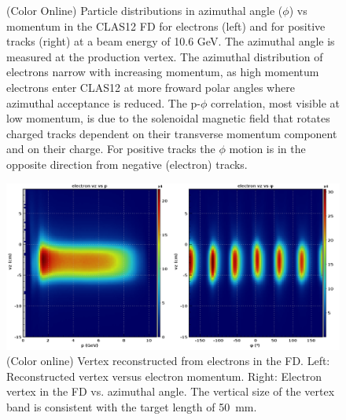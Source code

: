 \documentclass[final,3p,twocolumn]{elsarticle}
\begin{document}
\begin{figure}[h!]
\caption{(Color Online) Particle distributions in azimuthal angle ($\phi$) vs momentum in the CLAS12 FD for electrons (left) and for positive
 tracks (right) at a beam energy of 10.6 GeV.  The azimuthal angle is measured at the production vertex. The azimuthal distribution of electrons 
 narrow with increasing momentum, as high momentum electrons enter CLAS12 at more froward polar angles where azimuthal acceptance is
 reduced. The p-$\phi$ correlation, most visible at low momentum, is due to
  the solenoidal magnetic field that rotates charged tracks dependent on their transverse momentum component
  and on their charge. For positive tracks the $\phi$ motion is in the opposite direction from negative (electron) tracks.} 
\label{neg-pos}
\end{figure}
\begin{figure}[t!]
\centerline{\includegraphics[width=1.8\columnwidth]{e_vz.png}}
\caption{(Color online) Vertex reconstructed from electrons in the FD. Left: Reconstructed vertex versus electron momentum. 
Right: Electron vertex in the FD vs. azimuthal angle. The vertical size of the vertex band is consistent with the target length of 50~mm. } 
\label{vertex}
\end{figure}
\end{document}
